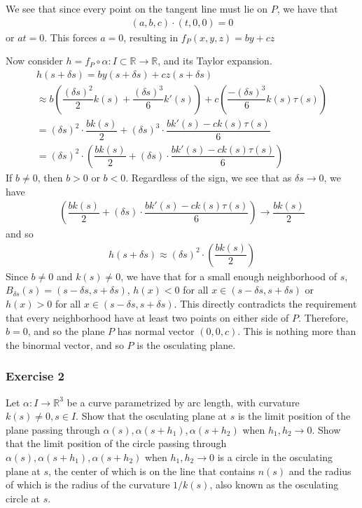 \documentclass{article}
\newcommand{\R}{\mathbb{R}}
\begin{document}
	We see that since every point on the tangent line must lie on $P$, we have that
	\begin{gather*}
		(a, b, c) \cdot (t, 0, 0) = 0
	\end{gather*}
	or $at = 0$. This forces $a = 0$, resulting in $f_P(x, y, z) = by + cz$

	Now consider $h = f_P \circ \alpha: I \subset \R \to \R$, and its Taylor expansion.
	\begin{gather*}
		h(s + \delta s) = b y(s + \delta s) + c z(s + \delta s) \\
		\approx b \left( \dfrac{(\delta s)^2}{2} k(s) + \dfrac{(\delta s)^3}{6} k'(s) \right)
		+ c \left( \dfrac{-(\delta s)^3}{6} k(s) \tau(s) \right) \\
		= (\delta s)^2 \cdot \dfrac{b k(s)}{2} + (\delta s)^3 \cdot \dfrac{b k'(s) - c k(s) \tau(s)}{6} \\
		= (\delta s)^2 \cdot \left( \dfrac{b k(s)}{2} + (\delta s) \cdot \dfrac{b k'(s) - c k(s) \tau(s)}{6} \right)
	\end{gather*}
	If $b \neq 0$, then $b > 0$ or $b < 0$. Regardless of the sign, we see that as $\delta s \to 0$, we have 
	\begin{gather*}
		\left( \dfrac{b k(s)}{2} + (\delta s) \cdot \dfrac{b k'(s) - c k(s) \tau(s)}{6} \right) \to \dfrac{b k(s)}{2}
	\end{gather*}
	and so
	\begin{gather*}
		h(s + \delta s) \approx (\delta s)^2 \cdot \left( \dfrac{b k(s)}{2} \right)
	\end{gather*}
	Since $b \neq 0$ and $k(s) \neq 0$, we have that for a small enough neighborhood of $s$, $B_{\delta s}(s) = (s - \delta s, s + \delta s)$, $h(x) < 0$ for all $x \in (s - \delta s, s + \delta s)$ or $h(x) > 0$ for all $x \in (s - \delta s, s + \delta s)$. This directly contradicts the requirement that every neighborhood have at least two points on either side of $P$. Therefore, $b = 0$, and so the plane $P$ has normal vector $(0, 0, c)$. This is nothing more than the binormal vector, and so $P$ is the osculating plane.
	
	\subsubsection*{Exercise 2}
	Let $\alpha: I \to \R^3$ be a curve parametrized by arc length, with curvature $k(s) \neq 0, s \in I$. Show that the osculating plane at $s$ is the limit position of the plane passing through $\alpha(s), \alpha(s + h_1), \alpha(s + h_2)$ when $h_1, h_2 \to 0$. Show that the limit position of the circle passing through $\alpha(s), \alpha(s + h_1), \alpha(s + h_2)$ when $h_1, h_2 \to 0$ is a circle in the osculating plane at $s$, the center of which is on the line that contains $n(s)$ and the radius of which is the radius of the curvature $1/k(s)$, also known as the osculating circle at $s$.
	
\end{document}
